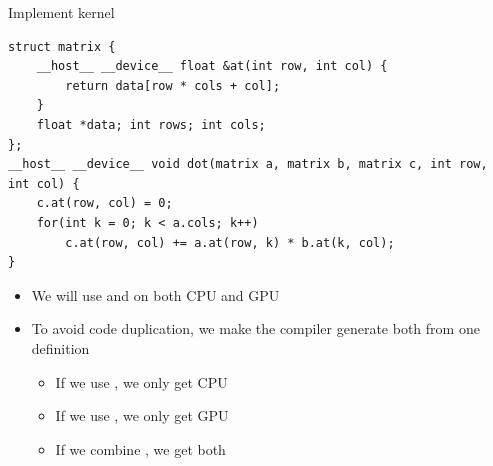 \begin{frame}[fragile]{Implement kernel}
    \begin{verbatim}
struct matrix {
    __host__ __device__ float &at(int row, int col) {
        return data[row * cols + col];
    }
    float *data; int rows; int cols;
};
__host__ __device__ void dot(matrix a, matrix b, matrix c, int row, int col) {
    c.at(row, col) = 0;
    for(int k = 0; k < a.cols; k++)
        c.at(row, col) += a.at(row, k) * b.at(k, col);
}
    \end{verbatim}
    \begin{itemize}
        \item We will use  and  on both CPU and GPU
        \item To avoid code duplication, we make the compiler generate both from one definition
        \begin{itemize}
            \item If we use , we only get CPU
            \item If we use , we only get GPU
            \item If we combine , we get both
        \end{itemize}
    \end{itemize}
\end{frame}

